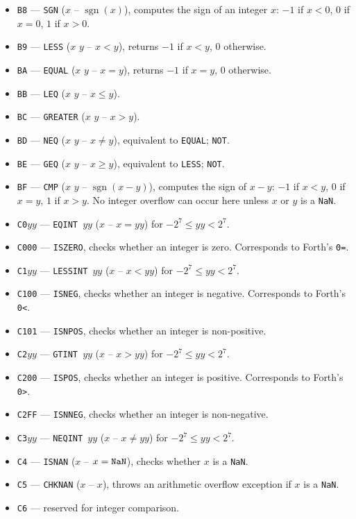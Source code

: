 \documentclass[12pt,oneside]{article}
\def\sgn{\operatorname{sgn}}
\begin{document}
\begin{itemize}
\item {\tt B8} --- {\tt SGN} ($x$ -- $\sgn(x)$), computes the sign of an integer $x$: $-1$ if $x<0$, $0$ if $x=0$, $1$ if $x>0$.
\item {\tt B9} --- {\tt LESS} ($x$ $y$ -- $x<y$), returns $-1$ if $x<y$, $0$ otherwise.
\item {\tt BA} --- {\tt EQUAL} ($x$ $y$ -- $x=y$), returns $-1$ if $x=y$, $0$ otherwise.
\item {\tt BB} --- {\tt LEQ} ($x$ $y$ -- $x\leq y$).
\item {\tt BC} --- {\tt GREATER} ($x$ $y$ -- $x>y$).
\item {\tt BD} --- {\tt NEQ} ($x$ $y$ -- $x\neq y$), equivalent to {\tt EQUAL}; {\tt NOT}.
\item {\tt BE} --- {\tt GEQ} ($x$ $y$ -- $x\geq y$), equivalent to {\tt LESS}; {\tt NOT}.
\item {\tt BF} --- {\tt CMP} ($x$ $y$ -- $\sgn(x-y)$), computes the sign of $x-y$: $-1$ if $x<y$, $0$ if $x=y$, $1$ if $x>y$. No integer overflow can occur here unless $x$ or $y$ is a {\tt NaN}.
\item {\tt C0$yy$} --- {\tt EQINT $yy$} ($x$ -- $x=yy$) for $-2^7\leq yy<2^7$.
\item {\tt C000} --- {\tt ISZERO}, checks whether an integer is zero. Corresponds to Forth's {\tt 0=}.
\item {\tt C1$yy$} --- {\tt LESSINT $yy$} ($x$ -- $x<yy$) for $-2^7\leq yy<2^7$.
\item {\tt C100} --- {\tt ISNEG}, checks whether an integer is negative. Corresponds to Forth's {\tt 0<}.
\item {\tt C101} --- {\tt ISNPOS}, checks whether an integer is non-positive.
\item {\tt C2$yy$} --- {\tt GTINT $yy$} ($x$ -- $x>yy$) for $-2^7\leq yy<2^7$.
\item {\tt C200} --- {\tt ISPOS}, checks whether an integer is positive. Corresponds to Forth's {\tt 0>}.
\item {\tt C2FF} --- {\tt ISNNEG}, checks whether an integer is non-negative.
\item {\tt C3$yy$} --- {\tt NEQINT $yy$} ($x$ -- $x\neq yy$) for $-2^7\leq yy<2^7$.
\item {\tt C4} --- {\tt ISNAN} ($x$ -- $x={\tt NaN}$), checks whether $x$ is a {\tt NaN}.
\item {\tt C5} --- {\tt CHKNAN} ($x$ -- $x$), throws an arithmetic overflow exception if $x$ is a {\tt NaN}.
\item {\tt C6} --- reserved for integer comparison.
\end{itemize}
\end{document}
